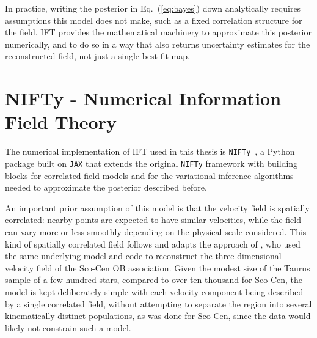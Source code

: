 In practice, writing the posterior in Eq.~(\ref{eq:bayes}) down analytically requires assumptions
this model does not make, such as a fixed correlation structure for the field.
IFT provides the mathematical machinery to approximate this posterior
numerically, and to do so in a way that also returns uncertainty estimates for the
reconstructed field, not just a single best-fit map.

\section{NIFTy - Numerical Information Field Theory}
\label{sec:nifty}

The numerical implementation of IFT used in this thesis is
\texttt{NIFTy}~\citep[\texttt{NIFTy.re};][]{Edenhofer2024}, a Python package built on
\texttt{JAX} that extends the original \texttt{NIFTy} framework \citep{niftycl} with
building blocks for correlated field models and for the variational inference
algorithms needed to approximate the posterior described before.

An important prior assumption of this model is that the velocity field is spatially
correlated: nearby points are expected to have similar velocities, while the field can vary
more or less smoothly depending on the physical scale considered. This kind of spatially
correlated field follows and adapts the approach of \citet{Hutschenreuter2026}, who used the same underlying
model and code to reconstruct the three-dimensional velocity field of the Sco-Cen OB
association. Given the modest size of the Taurus sample of a few hundred stars, compared to
over ten thousand for Sco-Cen, the model is kept
deliberately simple with each velocity component being described by a single correlated field,
without attempting to separate the region into several kinematically distinct populations, as
was done for Sco-Cen, since the data would likely not constrain such a model.


